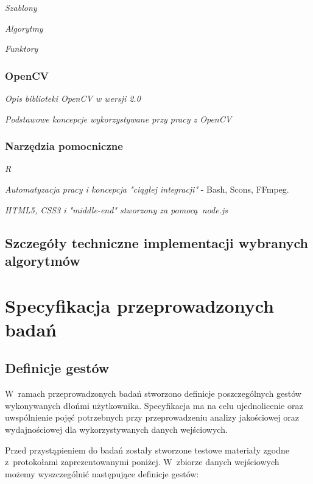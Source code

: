 \textit{Szablony}

\textit{Algorytmy}

\textit{Funktory}

\subsection{OpenCV}\label{Subsection_OpenCV}
\textit{Opis biblioteki OpenCV w wersji 2.0}\cite{LearningOpenCV}

\textit{Podstawowe koncepcje wykorzystywane przy pracy z OpenCV}\cite{OpenCVCookbook}

\subsection{Narzędzia pomocniczne}\label{Subsection_PomocniczeTechnologie}
\textit{R}

\textit{Automatyzacja pracy i koncepcja "ciągłej integracji"} - Bash, Scons, FFmpeg.

\textit{HTML5, CSS3 i "middle-end" stworzony za pomocą node.js}

\section{Szczegóły techniczne implementacji wybranych algorytmów}

\chapter{Specyfikacja przeprowadzonych badań}\label{Chapter_SpecyfikacjaPrzeprowadzonychBadan}

\section{Definicje gestów}\label{Section_DefinicjeGestow}

W~ramach przeprowadzonych badań stworzono definicje poszczególnych gestów wykonywanych dłońmi użytkownika. Specyfikacja ma na celu ujednolicenie oraz uwspólnienie pojęć potrzebnych przy przeprowadzeniu analizy jakościowej oraz wydajnościowej dla wykorzystywanych danych wejściowych.

Przed przystąpieniem do badań zostały stworzone testowe materiały zgodne z~protokołami zaprezentowanymi poniżej. W~zbiorze danych wejściowych możemy wyszczególnić następujące definicje gestów:

